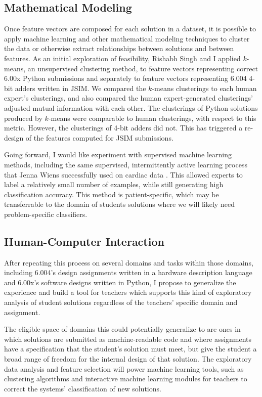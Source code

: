 \documentclass[12pt]{article}
\begin{document}
\subsection{Mathematical Modeling}

Once feature vectors are composed for each solution in a dataset, it is possible to apply machine learning and other mathematical modeling techniques to cluster the data or otherwise extract relationships between solutions and between features. As an initial exploration of feasibility, Rishabh Singh and I applied $k$-means, an unsupervised clustering method, to feature vectors representing correct 6.00x Python submissions and separately to feature vectors representing 6.004 4-bit adders written in JSIM. We compared the $k$-means clusterings to each human expert's clusterings, and also compared the human expert-generated clusterings' adjusted mutual information with each other. The clusterings of Python solutions produced by $k$-means were comparable to human clusterings, with respect to this metric. However, the clusterings of 4-bit adders did not. This has triggered a re-design of the features computed for JSIM submissions.

Going forward, I would like experiment with supervised machine learning methods, including the same supervised, intermittently active learning process that Jenna Wiens successfully used on cardiac data \cite{JWiensNIPS}. This allowed experts to label a relatively small number of examples, while still generating high classification accuracy. This method is patient-specific, which may be transferrable to the domain of students solutions where we will likely need problem-specific classifiers.

\subsection{Human-Computer Interaction}

After repeating this process on several domains and tasks within those domains, including 6.004's design assignments written in a hardware description language and 6.00x's software designs written in Python, I propose to generalize the experience and build a tool for teachers which supports this kind of exploratory analysis of student solutions regardless of the teachers' specific domain and assignment. 

The eligible space of domains this could potentially generalize to are ones in which solutions are submitted as machine-readable code and where assignments have a specification that the student's solution must meet, but give the student a broad range of freedom for the internal design of that solution. The exploratory data analysis and feature selection will power machine learning tools, such as clustering algorithms and interactive machine learning modules for teachers to correct the systems' classification of new solutions. 
\end{document}
